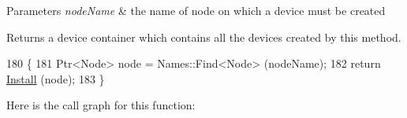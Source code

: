 \begin{DoxyParams}{Parameters}
{\em node\+Name} & the name of node on which a device must be created \\
\hline
\end{DoxyParams}
\begin{DoxyReturn}{Returns}
a device container which contains all the devices created by this method. 
\end{DoxyReturn}

\begin{DoxyCode}
180 \{
181   Ptr<Node> node = Names::Find<Node> (nodeName);
182   \textcolor{keywordflow}{return} \hyperlink{classns3_1_1AdhocAlohaNoackIdealPhyHelper_a0b9cb9d602fd1027f7f39a776e745abe}{Install} (node);
183 \}
\end{DoxyCode}


Here is the call graph for this function\+:


